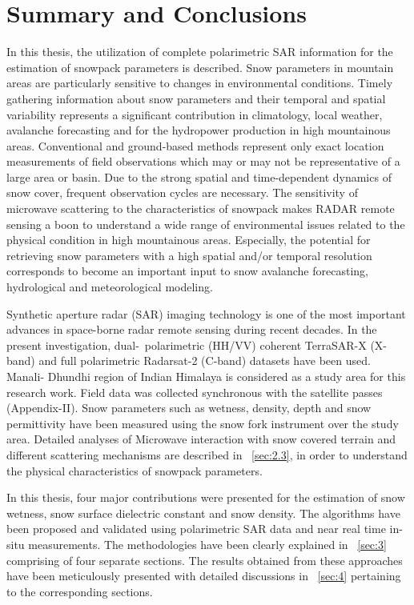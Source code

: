 \chapter{Summary and Conclusions}

In this thesis, the utilization of complete polarimetric SAR information for the estimation of snowpack parameters is described. Snow parameters in mountain areas are particularly sensitive to changes in environmental conditions. Timely gathering information about snow parameters and their temporal and spatial variability represents a significant contribution in climatology, local weather, avalanche forecasting and for the hydropower production in high mountainous areas. Conventional and ground-based methods represent only exact location measurements of field observations which may or may not be representative of a large area or basin. Due to the strong spatial and time-dependent dynamics of snow cover, frequent observation cycles are necessary. The sensitivity of microwave scattering to the characteristics of snowpack makes RADAR remote sensing a boon to understand a wide range of environmental issues related to the physical condition in high mountainous areas. Especially, the potential for retrieving snow parameters with a high spatial and/or temporal resolution corresponds to become an important input to snow avalanche forecasting, hydrological and meteorological modeling. 

Synthetic aperture radar (SAR) imaging technology is one of the most important advances in space-borne radar remote sensing during recent decades. In the present investigation, dual-~polarimetric (HH/VV) coherent TerraSAR-X (X-band) and full polarimetric Radarsat-2 (C-band) datasets have been used. Manali- Dhundhi region of Indian Himalaya is considered as a study area for this research work. Field data was collected synchronous with the satellite passes (Appendix-II). Snow parameters such as wetness, density, depth and snow permittivity have been measured using the snow fork instrument over the study area. Detailed analyses of  Microwave interaction with snow covered terrain and different scattering mechanisms are described in ~\cref{sec:2.3}, in order to understand the physical characteristics of snowpack parameters.

In this thesis, four major contributions were presented for the estimation of snow wetness, snow surface dielectric constant and snow density. The algorithms have been proposed and validated using polarimetric SAR data and near real time in-situ measurements. The methodologies have been clearly explained in ~\cref{sec:3} comprising of four separate sections. The results obtained from these approaches have been meticulously presented with detailed discussions in ~\cref{sec:4} pertaining to the corresponding sections.

